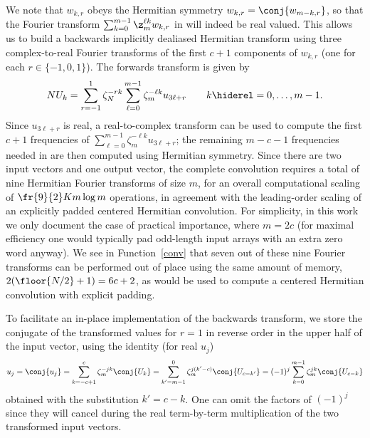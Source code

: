 \documentclass[final]{siamltex}
\def\bel{\begin{dmath}}
\def\eel{\end{dmath}}
\def\no{\hiderel}
\begin{document}
We note that $w_{k,r}$ obeys the Hermitian symmetry 
$w_{k,r}=\conj{w_{m-k,r}}$, so that the Fourier transform
$\sum_{k=0}^{m-1}\z_m^{\ell k} w_{k,r}$ in  will indeed
be real valued. This allows us to build a backwards implicitly dealiased
Hermitian transform using three complex-to-real Fourier transforms of the
first $c+1$ components of $w_{k,r}$ (one for each $r\in\{-1,0,1\}$). The
forwards transform is given by
\bel
NU_k
=\sum_{r=-1}^{1}\zeta_N^{-rk}\sum_{\ell=0}^{m-1}\zeta_m^{-\ell k} u_{3\ell+r}
\qquad k\no =0,\ldots,m-1.\label{fft0forwardsB}
\eel
Since $u_{3\ell+r}$ is real, a real-to-complex transform can be used to
compute the first $c+1$ frequencies of
$\sum_{\ell=0}^{m-1}\zeta_m^{-\ell k} u_{3\ell+r}$; the remaining $m-c-1$
frequencies needed in  are then computed using Hermitian
symmetry. Since there are two input vectors and
one output vector, the complete convolution requires a total of nine
Hermitian Fourier transforms of size $m$, for an overall computational
scaling of $\fr{9}{2}K m \log m$ operations, in agreement with the
leading-order scaling of an explicitly padded centered Hermitian convolution.
For simplicity, in this work we only document the case of practical
importance, where $m=2c$ (for maximal efficiency one would typically pad
odd-length input arrays with an extra zero word anyway). We see in
Function~\ref{conv} that seven out of these nine Fourier transforms can be
performed out of place using the same amount of memory,
$2(\floor{N/2}+1)=6c+2$, as would be used to compute a centered Hermitian
convolution with explicit padding. 

To facilitate an in-place implementation of the
backwards transform, we store the conjugate of the transformed values for
$r=1$ in reverse order in the upper half of the input vector,
using the identity (for real $u_j$)
$$
u_j=\conj{u_j}=\sum_{k=-c+1}^{c}\zeta_m^{-jk} \conj{U_k}
=\sum_{k'=m-1}^{0}\zeta_m^{j(k'-c)} \conj{U_{c-k'}}
=(-1)^j\sum_{k=0}^{m-1}\zeta_m^{jk} \conj{U_{c-k}}
$$
obtained with the substitution $k'=c-k$. One can omit the factors of
$(-1)^j$ since they will cancel during the real term-by-term multiplication
of the two transformed input vectors.
\end{document}
